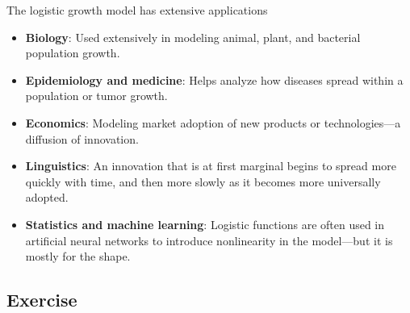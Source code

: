 \begin{frame}{The logistic growth model has extensive applications}

\begin{itemize}
    \item \textbf{Biology}: Used extensively in modeling animal, plant, and bacterial population growth.
    \pause
    \item \textbf{Epidemiology and medicine}: Helps analyze how diseases spread within a population or tumor growth.
    \pause
    \item \textbf{Economics}: Modeling market adoption of new products or technologies—a diffusion of innovation.
    \pause
    \item \textbf{Linguistics}: An innovation that is at first marginal begins to spread more quickly with time, and then more slowly as it becomes more universally adopted.
    \pause
    \item \textbf{Statistics and machine learning}: Logistic functions are often used in artificial neural networks to introduce nonlinearity in the model—but it is mostly for the shape. 
\end{itemize}

\end{frame}

\subsection{Exercise}

